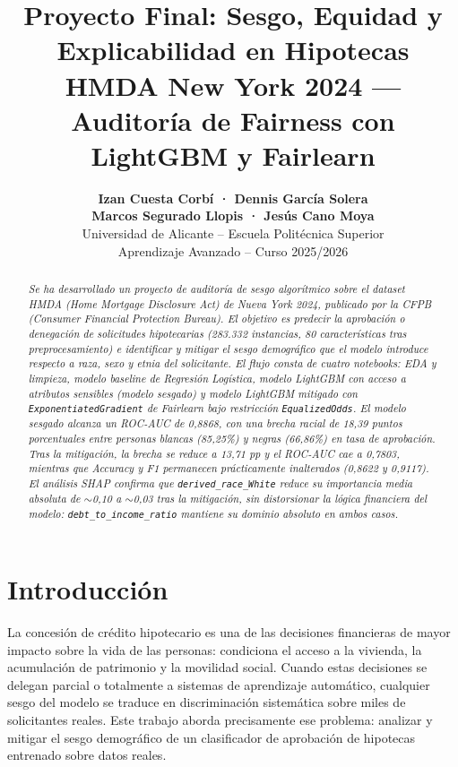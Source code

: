 \documentclass[11pt,a4paper]{article}
\title{\textbf{Proyecto Final: Sesgo, Equidad y Explicabilidad en Hipotecas}\\
\large HMDA New York 2024 — Auditoría de Fairness con LightGBM y Fairlearn}
\author{
    \textbf{Izan Cuesta Corbí · Dennis García Solera}\\
    \textbf{Marcos Segurado Llopis · Jesús Cano Moya}\\
    \small Universidad de Alicante -- Escuela Politécnica Superior\\
    \small Aprendizaje Avanzado -- Curso 2025/2026
}
\date{}
\begin{document}
\maketitle

\begin{abstract}
\textit{Se ha desarrollado un proyecto de auditoría de sesgo algorítmico sobre el dataset HMDA
(\textit{Home Mortgage Disclosure Act}) de Nueva York 2024, publicado por la CFPB
(\textit{Consumer Financial Protection Bureau}). El objetivo es predecir la aprobación o denegación
de solicitudes hipotecarias (283.332 instancias, 80 características tras preprocesamiento) e identificar
y mitigar el sesgo demográfico que el modelo introduce respecto a raza, sexo y etnia del solicitante.
El flujo consta de cuatro notebooks: EDA y limpieza, modelo baseline de Regresión Logística,
modelo LightGBM con acceso a atributos sensibles (modelo sesgado) y modelo LightGBM mitigado
con \texttt{ExponentiatedGradient} de Fairlearn bajo restricción \texttt{EqualizedOdds}.
El modelo sesgado alcanza un ROC-AUC de 0{,}8868, con una brecha racial de 18{,}39 puntos
porcentuales entre personas blancas (85{,}25\%) y negras (66{,}86\%) en tasa de aprobación.
Tras la mitigación, la brecha se reduce a 13{,}71 pp y el ROC-AUC cae a 0{,}7803,
mientras que Accuracy y F1 permanecen prácticamente inalterados (0{,}8622 y 0{,}9117).
El análisis SHAP confirma que \texttt{derived\_race\_White} reduce su importancia media absoluta
de $\sim$0{,}10 a $\sim$0{,}03 tras la mitigación, sin distorsionar la lógica financiera del modelo:
\texttt{debt\_to\_income\_ratio} mantiene su dominio absoluto en ambos casos.}
\end{abstract}

\tableofcontents
\newpage

\section{Introducción}

La concesión de crédito hipotecario es una de las decisiones financieras de mayor impacto sobre
la vida de las personas: condiciona el acceso a la vivienda, la acumulación de patrimonio y la
movilidad social. Cuando estas decisiones se delegan parcial o totalmente a sistemas de aprendizaje
automático, cualquier sesgo del modelo se traduce en discriminación sistemática sobre miles de
solicitantes reales. Este trabajo aborda precisamente ese problema: analizar y mitigar el sesgo
demográfico de un clasificador de aprobación de hipotecas entrenado sobre datos reales.
\end{document}
